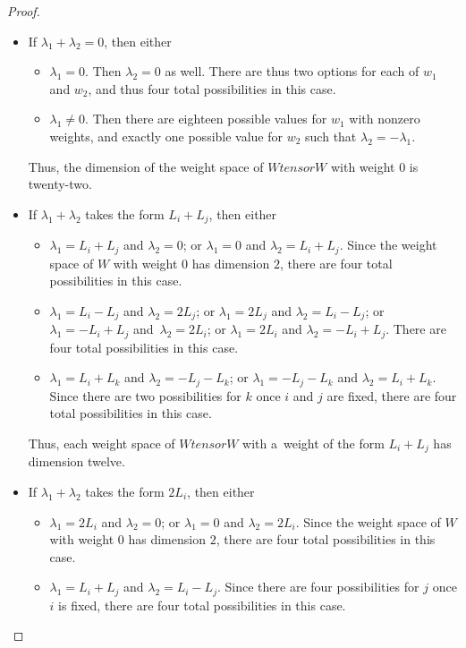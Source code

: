 \documentclass[10pt,a4paper]{amsart}
\numberwithin{equation}{section}
\theoremstyle{definition}
\def\otimes{ tensor }
\begin{document}
\begin{proof}
 \begin{itemize}\itemsep=0pt
 \item If $\lambda_1+\lambda_2 = 0$, then either
 \begin{itemize}\itemsep=0pt
\item[$*$] $\lambda_1 = 0$. Then $\lambda_2 = 0$ as well. There are thus two options for each of $w_1$ and $w_2$, and thus four total possibilities in this case.
\item[$*$] $\lambda_1 \ne 0$. Then there are eighteen possible values for $w_1$ with nonzero weights, and exactly one possible value for $w_2$ such that $\lambda_2 = -\lambda_1$.
 \end{itemize}
 Thus, the dimension of the weight space of $W \otimes W$ with weight $0$ is twenty-two.
 \item If $\lambda_1+\lambda_2$ takes the form $L_i+L_j$, then either
 \begin{itemize}\itemsep=0pt
\item[$*$] $\lambda_1 = L_i + L_j$ and $\lambda_2 = 0$; or $\lambda_1 = 0$ and $\lambda_2 = L_i + L_j$. Since the weight space of $W$ with weight $0$ has dimension $2$, there are four total possibilities in this case.
\item[$*$] $\lambda_1 = L_i - L_j$ and $\lambda_2 = 2L_j$; or $\lambda_1 = 2L_j$ and $\lambda_2 = L_i - L_j$; or $\lambda_1 = -L_i + L_j$ and~${\lambda_2 = 2L_i}$; or $\lambda_1 = 2L_i$ and $\lambda_2 = -L_i + L_j$. There are four total possibilities in this case.
\item[$*$] $\lambda_1 = L_i + L_k$ and $\lambda_2 = -L_j - L_k$; or $\lambda_1 = -L_j - L_k$ and $\lambda_2 = L_i + L_k$. Since there are two possibilities for $k$ once $i$ and $j$ are fixed, there are four total possibilities in this case.
 \end{itemize}
 Thus, each weight space of $W \otimes W$ with a~weight of the form $L_i + L_j$ has dimension twelve.
 \item If $\lambda_1 + \lambda_2$ takes the form $2L_i$, then either
 \begin{itemize}\itemsep=0pt
\item[$*$] $\lambda_1 = 2L_i$ and $\lambda_2 = 0$; or $\lambda_1 = 0$ and $\lambda_2 = 2L_i$. Since the weight space of $W$ with weight $0$ has dimension $2$, there are four total possibilities in this case.
\item[$*$] $\lambda_1 = L_i + L_j$ and $\lambda_2 = L_i - L_j$. Since there are four possibilities for $j$ once $i$ is fixed, there are four total possibilities in this case.

\end{itemize}
\end{itemize}
\end{proof}
\end{document}
